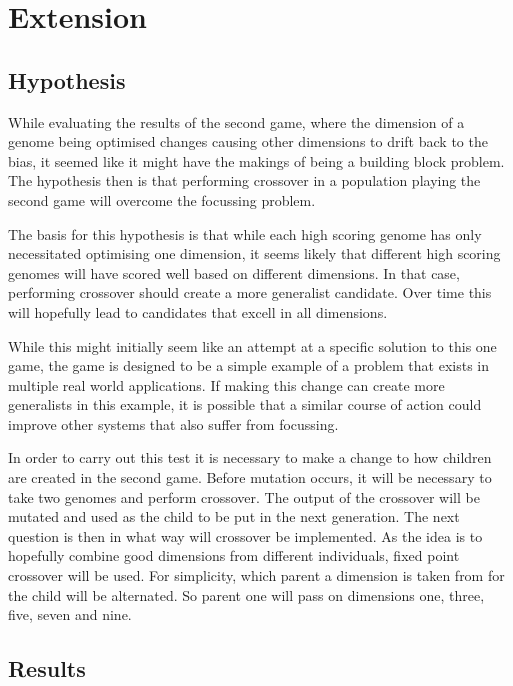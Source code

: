 \documentclass{article}
\begin{document}
\section{Extension}

\subsection{Hypothesis}
While evaluating the results of the second game, where the dimension of a genome being optimised changes causing other dimensions to drift back to the bias, it seemed like it might have the makings of being a building block problem\cite{watson2007, forrest1993}. The hypothesis then is that performing crossover in a population playing the second game will overcome the focussing problem.

The basis for this hypothesis is that while each high scoring genome has only necessitated optimising one dimension, it seems likely that different high scoring genomes will have scored well based on different dimensions. In that case, performing crossover should create a more generalist candidate. Over time this will hopefully lead to candidates that excell in all dimensions.

While this might initially seem like an attempt at a specific solution to this one game, the game is designed to be a simple example of a problem that exists in multiple real world applications. If making this change can create more generalists in this example, it is possible that a similar course of action could improve other systems that also suffer from focussing.

In order to carry out this test it is necessary to make a change to how children are created in the second game. Before mutation occurs, it will be necessary to take two genomes and perform crossover. The output of the crossover will be mutated and used as the child to be put in the next generation. The next question is then in what way will crossover be implemented. As the idea is to hopefully combine good dimensions from different individuals, fixed point crossover will be used. For simplicity, which parent a dimension is taken from for the child will be alternated. So parent one will pass on dimensions one, three, five, seven and nine. 

\subsection{Results}
\end{document}
